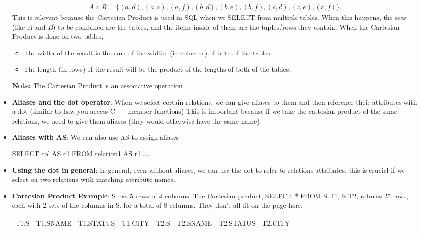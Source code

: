 \documentclass{report}
\begin{document}
\begin{itemize}
        \begin{align*}
            A \times B = \{(a, d), (a, e), (a, f), (b , d), (b , e), (b ,f), (c, d), (c, e), (c, f)\}
        .\end{align*}
        \bigbreak \noindent 
        This is relevant because the Cartesian Product is used in SQL when we SELECT from multiple tables. When this happens, the sets (like $A$ and $B$) to be combined are the tables, and the items inside of them are the tuples/rows they contain.
        \bigbreak \noindent 
        When the Cartesian Product is done on two tables,
        \begin{itemize}
            \item The width of the result is the sum of the widths (in columns) of both of the tables.
            \item The length (in rows) of the result will be the product of the lengths of both of the tables.
        \end{itemize}
        \bigbreak \noindent 
        \textbf{Note:} The Cartesian Product is an associative operation
    \item \textbf{Aliases and the dot operator}: When we select certain relations, we can give aliases to them and then reference their attributes with a dot (similar to how you access C++ member functions)
        \bigbreak \noindent 
        This is important because if we take the cartesian product of the same relations, we need to give them aliases (they would otherwise have the same name)
    \item \textbf{Aliases with AS}: We can also use AS to assign aliases
        \bigbreak \noindent 
        \begin{sqlcode}
        SELECT col AS c1
            FROM relation1 AS r1
            ...
        \end{sqlcode}
    \item \textbf{Using the dot in general}: In general, even without aliases, we can use the dot to refer to relations attributes, this is crucial if we select on two relations with matching attribute names.
    \item \textbf{Cartesian Product Example}: S has 5 rows of 4 columns. The Cartesian product, SELECT * FROM S T1, S T2; returns 25 rows, each with 2 sets of the columns in S, for a total of 8 columns. They don't all fit on the page here.
        \bigbreak \noindent 
        \begin{center}
            \begin{tabular}{c|c|c|c|c|c|c|c}
                T1.S &T1.SNAME &T1.STATUS &T1.CITY &T2.S &T2.SNAME &T2.STATUS &T2.CITY \\

\end{tabular}
\end{center}
\end{itemize}
\end{document}
